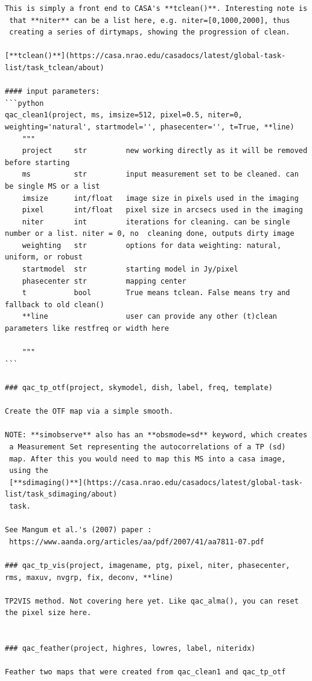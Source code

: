 \documentclass[11pt,twoside]{article}
\begin{document}
\begin{verbatim}
This is simply a front end to CASA's **tclean()**. Interesting note is
 that **niter** can be a list here, e.g. niter=[0,1000,2000], thus
 creating a series of dirtymaps, showing the progression of clean.

[**tclean()**](https://casa.nrao.edu/casadocs/latest/global-task-list/task_tclean/about)

#### input parameters:
```python
qac_clean1(project, ms, imsize=512, pixel=0.5, niter=0, weighting='natural', startmodel='', phasecenter='', t=True, **line)
    """
    project     str         new working directly as it will be removed before starting
    ms          str         input measurement set to be cleaned. can be single MS or a list
    imsize      int/float   image size in pixels used in the imaging
    pixel       int/float   pixel size in arcsecs used in the imaging
    niter       int         iterations for cleaning. can be single number or a list. niter = 0, no  cleaning done, outputs dirty image
    weighting   str         options for data weighting: natural, uniform, or robust
    startmodel  str         starting model in Jy/pixel
    phasecenter str         mapping center
    t           bool        True means tclean. False means try and fallback to old clean()
    **line                  user can provide any other (t)clean parameters like restfreq or width here
    
    """
```

### qac_tp_otf(project, skymodel, dish, label, freq, template)

Create the OTF map via a simple smooth.

NOTE: **simobserve** also has an **obsmode=sd** keyword, which creates
 a Measurement Set representing the autocorrelations of a TP (sd)
 map. After this you would need to map this MS into a casa image,
 using the
 [**sdimaging()**](https://casa.nrao.edu/casadocs/latest/global-task-list/task_sdimaging/about)
 task.

See Mangum et al.'s (2007) paper :
 https://www.aanda.org/articles/aa/pdf/2007/41/aa7811-07.pdf

### qac_tp_vis(project, imagename, ptg, pixel, niter, phasecenter, rms, maxuv, nvgrp, fix, deconv, **line)

TP2VIS method. Not covering here yet. Like qac_alma(), you can reset the pixel size here.


### qac_feather(project, highres, lowres, label, niteridx)

Feather two maps that were created from qac_clean1 and qac_tp_otf


\end{verbatim}
\end{document}
